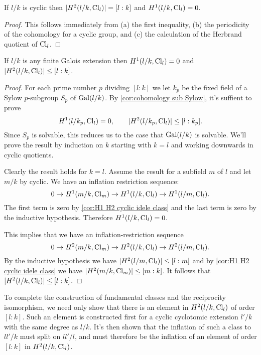 \begin{corollary} \label{cor:H1 H2 cyclic idele class}
	If $l/k$ is cyclic then $|H^2(l/k, \mathrm{Cl}_{l})| = [l:k]$ and $H^1(l/k, \mathrm{Cl}_{l}) = 0$.
\end{corollary}

\begin{proof}
	This follows immediately from (a) the first inequality, (b) the periodicity of
	the cohomology for a cyclic group, and (c) the calculation of the Herbrand quotient
	of $\mathrm{Cl}_{l}$.
\end{proof}

\begin{theorem}
	If $l/k$ is any finite Galois extension then $H^1(l/k, \mathrm{Cl}_{l}) = 0$
	and $|H^2(l/k, \mathrm{Cl}_{l})| \le [l:k]$.
\end{theorem}


\begin{proof}
	For each prime number $p$ dividing $[l:k]$ we let $k_p$ be the fixed
	field of a Sylow $p$-subgroup $S_p$ of $\mathrm{Gal}(l/k)$.
	By \ref{cor:cohomology sub Sylow}, it's suffient to prove
	\[
		H^1(l/k_p, \mathrm{Cl}_{l}) = 0, \qquad
		|H^2(l/k_p, \mathrm{Cl}_{l})| \le [l:k_p].
	\]
	Since $S_p$ is solvable, this reduces us to the case that $\mathrm{Gal}(l/k)$ is solvable.
	We'll prove the result by induction on $k$ starting with $k=l$ and working downwards
	in cyclic quotients.

	Clearly the result holds for $k=l$.
	Assume the result for a subfield $m$ of $l$ and let $m/k$ by cyclic.
	We have an inflation restriction sequence:
	\[
		0 \to H^1(m/k, \mathrm{Cl}_{m}) \to H^1(l/k, \mathrm{Cl}_{l}) \to H^1(l/m,\mathrm{Cl}_{l}).
	\]
	The first term is zero by \ref{cor:H1 H2 cyclic idele class} and the last term is zero by
	the inductive hypothesis.
	Therefore $H^1(l/k,\mathrm{Cl}_l)=0$.

	This implies that we have an inflation-restriction sequence
	\[
		0 \to H^2(m/k, \mathrm{Cl}_m) \to H^2(l/k, \mathrm{Cl}_l) \to H^2(l/m,\mathrm{Cl}_l).
	\]
	By the inductive hypothesis we have $|H^2(l/m,\mathrm{Cl}_l)| \le [l:m]$
	and by \ref{cor:H1 H2 cyclic idele class} we have $|H^2(m/k, \mathrm{Cl}_m)| \le [m : k]$.
	It follows that $|H^2(l/k,\mathrm{Cl}_l)| \le [l : k]$.
\end{proof}


To complete the construction of fundamental classes and the reciprocity isomorphism,
we need only show that there is an element in $H^2(l/k,\mathrm{Cl}_l)$ of order $[l:k]$.
Such an element is constructed first for a cyclic cyclotomic extension $l'/k$ with the same degree
as $l/k$.
It's then shown that the inflation of such a class to $ll'/k$ must split on $ll'/l$,
and must therefore be the inflation of an element of order $[l:k]$ in $H^2(l/k,\mathrm{Cl}_l)$.
